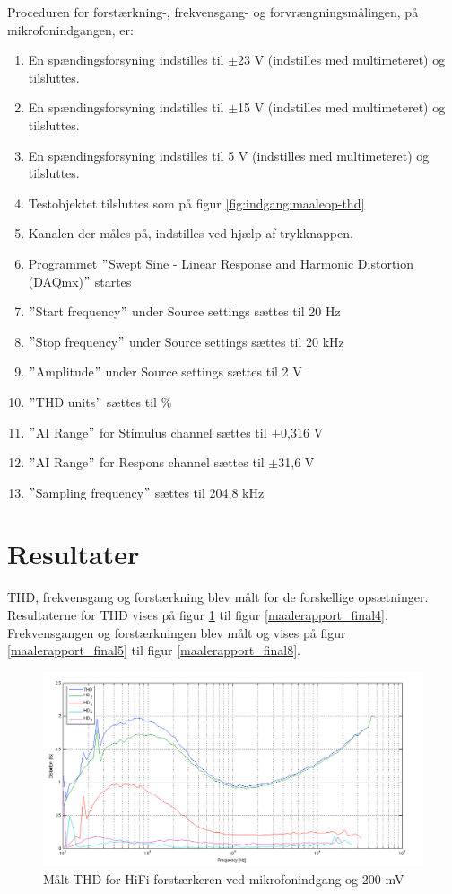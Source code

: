 Proceduren for forstærkning-, frekvensgang- og forvrængningsmålingen, på mikrofonindgangen, er:

\begin{enumerate}
\item En spændingsforsyning indstilles til $\pm$23 V (indstilles med multimeteret) og tilsluttes.
\item En spændingsforsyning indstilles til $\pm$15 V (indstilles med multimeteret) og tilsluttes.
\item En spændingsforsyning indstilles til 5 V (indstilles med multimeteret) og tilsluttes.
\item Testobjektet tilsluttes som på figur \ref{fig:indgang:maaleop-thd}
\item Kanalen der måles på, indstilles ved hjælp af trykknappen.
\item Programmet $"$Swept Sine - Linear Response and Harmonic Distortion (DAQmx)$"$ startes
\item $"$Start frequency$"$ under Source settings sættes til 20 Hz
\item $"$Stop frequency$"$ under Source settings sættes til 20 kHz
\item $"$Amplitude$"$ under Source settings sættes til 2 V
\item $"$THD units$"$ sættes til \%
\item $"$AI Range$"$ for Stimulus channel sættes til $\pm$0,316 V
\item $"$AI Range$"$ for Respons channel sættes til $\pm$31,6 V
\item $"$Sampling frequency$"$ sættes til 204,8 kHz
\end{enumerate}

\section*{Resultater}

THD, frekvensgang og forstærkning blev målt for de forskellige opsætninger. Resultaterne for THD vises på figur \ref{maalerapport_final1} til figur \ref{maalerapport_final4}. Frekvensgangen og forstærkningen blev målt og vises på figur \ref{maalerapport_final5} til figur \ref{maalerapport_final8}.

\begin{figure}[h]
\centering
\includegraphics[width=\textwidth]{maalerapporter/final/mic/final_mic_3,16mv_thd.png}
\caption{Målt THD for HiFi-forstærkeren ved mikrofonindgang og 200 mV}
\label{maalerapport_final1}
\end{figure}

